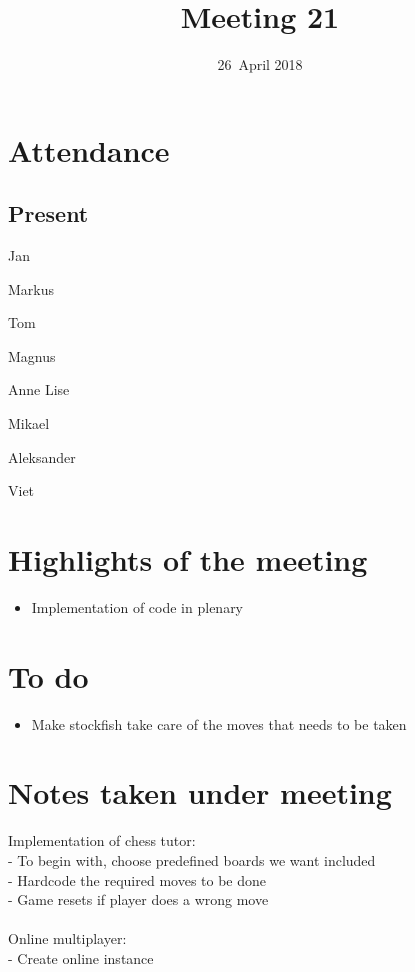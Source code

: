 \documentclass[letterpaper,11pt]{article}
\title{Meeting 21}
\date{26~April 2018}
\begin{document}
\maketitle
\section*{Attendance}
\subsection*{Present}
\begin{list}{}{}
	\item Jan
	\item Markus
	\item Tom
	\item Magnus
	\item Anne Lise
	\item Mikael
	\item Aleksander
	\item Viet
\end{list}

\newpage
\section*{Highlights of the meeting}
\begin{itemize}
	\item Implementation of code in plenary
\end{itemize}

\section*{To do}
\begin{itemize}
	\item Make stockfish take care of the moves that needs to be taken 
\end{itemize}

\section*{Notes taken under meeting}
Implementation of chess tutor:\\
- To begin with, choose predefined boards we want included\\
- Hardcode the required moves to be done\\
- Game resets if player does a wrong move\\\\
Online multiplayer:\\
- Create online instance
\end{document}
